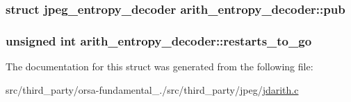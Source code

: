 \subsubsection[{pub}]{\setlength{\rightskip}{0pt plus 5cm}struct {\bf jpeg\+\_\+entropy\+\_\+decoder} arith\+\_\+entropy\+\_\+decoder\+::pub}\label{structarith__entropy__decoder_a26f1da810c05744076bad3072983d0d1}
\hypertarget{structarith__entropy__decoder_ab587034265fc6747822cfb11167e4004}{}
\subsubsection[{restarts\+\_\+to\+\_\+go}]{\setlength{\rightskip}{0pt plus 5cm}unsigned int arith\+\_\+entropy\+\_\+decoder\+::restarts\+\_\+to\+\_\+go}\label{structarith__entropy__decoder_ab587034265fc6747822cfb11167e4004}


The documentation for this struct was generated from the following file\+:\begin{DoxyCompactItemize}
\item 
src/third\+\_\+party/orsa-\/fundamental\+\_./src/third\+\_\+party/jpeg/\hyperlink{jdarith_8c}{jdarith.\+c}\end{DoxyCompactItemize}

